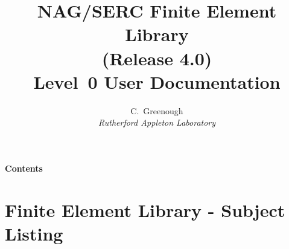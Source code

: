 \marginparsep 10pt      %
\topmargin -20pt        %
\headheight 12pt        %
\headsep 25pt           %
\footskip 50pt          %
\footheight 12pt        %
\textheight 646pt       %
\textwidth 450pt        %
\oddsidemargin 0pt      %
\evensidemargin 0pt     %
%
\title{\Huge \bf NAG/SERC Finite Element Library\\
 (Release 4.0)\\[10mm]
Level~0 User Documentation}
\author{\Large C.~Greenough\\
               \it Rutherford Appleton Laboratory}

\maketitle
\newpage                   

\newpage            
\begin{center}                                         %
\large\bf Contents                                         %
\end{center}                                         %
\section*{Finite Element Library - Subject Listing}     %
\vskip 10pt
\vskip 10pt\small\noindent                      

\newpage
%
